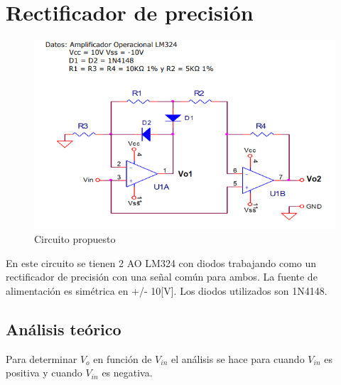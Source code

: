 \newpage
\section{Rectificador de precisión}
\onehalfspacing
\begin{figure}[htb]
	\centering
	\includegraphics[width=1\textwidth]{figuras/Circuito3_consigna.png}
	\caption{Circuito propuesto}
\end{figure}
En este circuito se tienen 2 AO LM324 con diodos trabajando como un rectificador de precisión con una señal común para ambos. La fuente de alimentación es simétrica en +/- 10[V]. Los diodos utilizados son 1N4148.
\subsection{Análisis teórico}
Para determinar $V_o$ en función de $V_{in}$ el análisis se hace para cuando $V_{in}$ es positiva y cuando $V_{in}$ es negativa.
